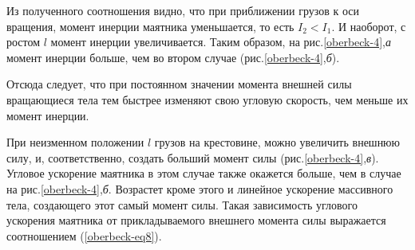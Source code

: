 \documentclass[All.tex]{subfiles}
\begin{document}
    Из полученного соотношения видно, что при приближении грузов к оси вращения, момент инерции маятника уменьшается, то есть $ I_2<I_1 $.
    И наоборот, с ростом $ l $ момент инерции увеличивается.
    Таким образом, на рис.\ref{oberbeck-4},\textit{а} момент инерции больше, чем во втором случае (рис.\ref{oberbeck-4},\textit{б}).
    
    Отсюда следует, что при постоянном значении момента внешней силы вращающиеся тела тем быстрее изменяют свою угловую скорость, чем меньше их момент инерции.
		
 При неизменном положении $ l $ грузов на крестовине, можно увеличить внешнюю силу, и, соответственно, создать больший момент силы (рис.\ref{oberbeck-4},\textit{в}). 
	Угловое ускорение маятника в этом случае также окажется больше, чем в случае на рис.\ref{oberbeck-4},\textit{б}.
	Возрастет кроме этого и линейное ускорение массивного тела, создающего этот самый момент силы.
	Такая зависимость углового ускорения маятника от прикладываемого внешнего момента силы выражается соотношением (\ref{oberbeck-eq8}).  
\end{document}
